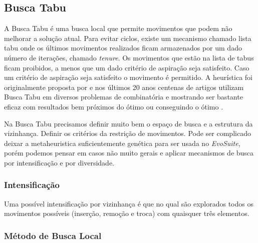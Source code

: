\documentclass[conference]{IEEEtran}
\begin{document}
\subsection{Busca Tabu}
\label{sec:busca_tabu}

    A Busca Tabu é uma busca local que permite movimentos que podem não melhorar a solução atual. Para evitar ciclos, existe um mecanismo chamado lista tabu onde os últimos movimentos realizados
    ficam armazenados por um dado número de iterações, chamado \textit{tenure}. Os movimentos que estão na lista de tabus ficam proibidos, a menos que um dado critério de aspiração seja
    satisfeito. Caso um critério de aspiração seja satisfeito o movimento é permitido. A heurística foi originalmente proposta por \cite{glover1986future} \cite{glover1986future} e nos
    últimos 20 anos centenas de artigos utilizam Busca Tabu em diversos problemas de combinatória e mostrando ser bastante eficaz com resultados bem próximos do ótimo ou conseguindo o ótimo
    \cite{gendreau2010handbook}.

    Na Busca Tabu precisamos definir muito bem o espaço de busca e a estrutura da vizinhança. Definir os critérios da restrição de movimentos. Pode ser complicado deixar a metaheuristica
    suficientemente genética para ser usada no \emph{EvoSuite}, porém podemos pensar em casos não muito gerais e aplicar mecanismos de busca por intensificação e por diversidade.


    \subsubsection{Intensificação}

        Uma possível intensificação por vizinhança é que no qual são explorados todos os movimentos possíveis (inserção, remoção e troca) com quaisquer três elementos. 

    \subsubsection{Método de Busca Local}
\end{document}
